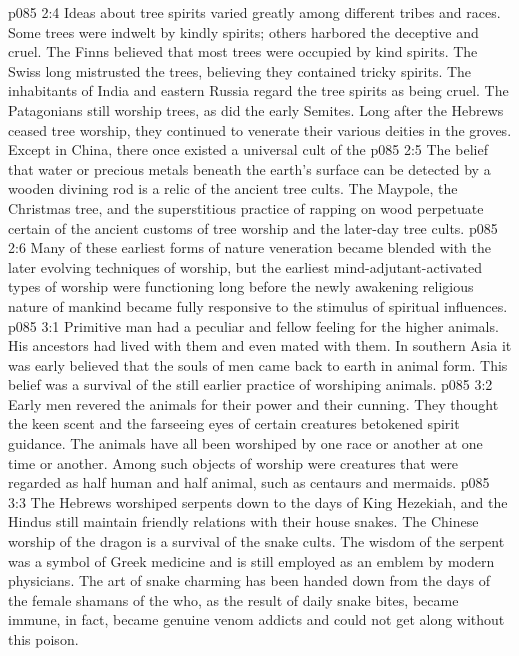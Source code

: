 \vs p085 2:4 Ideas about tree spirits varied greatly among different tribes and races. Some trees were indwelt by kindly spirits; others harbored the deceptive and cruel. The Finns believed that most trees were occupied by kind spirits. The Swiss long mistrusted the trees, believing they contained tricky spirits. The inhabitants of India and eastern Russia regard the tree spirits as being cruel. The Patagonians still worship trees, as did the early Semites. Long after the Hebrews ceased tree worship, they continued to venerate their various deities in the groves. Except in China, there once existed a universal cult of the 
\vs p085 2:5 The belief that water or precious metals beneath the earth’s surface can be detected by a wooden divining rod is a relic of the ancient tree cults. The Maypole, the Christmas tree, and the superstitious practice of rapping on wood perpetuate certain of the ancient customs of tree worship and the later\hyp{}day tree cults.
\vs p085 2:6 Many of these earliest forms of nature veneration became blended with the later evolving techniques of worship, but the earliest mind\hyp{}adjutant\hyp{}activated types of worship were functioning long before the newly awakening religious nature of mankind became fully responsive to the stimulus of spiritual influences.
\vs p085 3:1 Primitive man had a peculiar and fellow feeling for the higher animals. His ancestors had lived with them and even mated with them. In southern Asia it was early believed that the souls of men came back to earth in animal form. This belief was a survival of the still earlier practice of worshiping animals.
\vs p085 3:2 Early men revered the animals for their power and their cunning. They thought the keen scent and the farseeing eyes of certain creatures betokened spirit guidance. The animals have all been worshiped by one race or another at one time or another. Among such objects of worship were creatures that were regarded as half human and half animal, such as centaurs and mermaids.
\vs p085 3:3 The Hebrews worshiped serpents down to the days of King Hezekiah, and the Hindus still maintain friendly relations with their house snakes. The Chinese worship of the dragon is a survival of the snake cults. The wisdom of the serpent was a symbol of Greek medicine and is still employed as an emblem by modern physicians. The art of snake charming has been handed down from the days of the female shamans of the  who, as the result of daily snake bites, became immune, in fact, became genuine venom addicts and could not get along without this poison.
